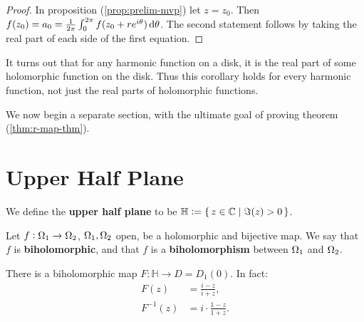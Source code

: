 \begin{proof}
In proposition (\ref{prop:prelim-mvp}) let $z=z_0$. Then $f(z_0) = a_0 = \frac{1}{2 \pi} \int_0^{2 \pi} f( z_0 + r e^{i \theta} ) \dif \theta$. The second statement follows by taking the real part of each side of the first equation.
\end{proof}

\begin{remark}
It turns out that for any harmonic function on a disk, it is the real part of some holomorphic function on the disk. Thus this corollary holds for every harmonic function, not just the real parts of holomorphic functions.
\end{remark}

We now begin a separate section, with the ultimate goal of proving theorem (\ref{thm:r-map-thm}).

\section{Upper Half Plane}

\begin{definition}
We define the \textbf{upper half plane} to be $\mathbb{H} \vcentcolon = \set{z \in \mathbb{C}\mid \Im (z) > 0}$.

\end{definition}


\begin{definition}
Let $f: \Omega_1 \to \Omega_2$, $\Omega_1, \Omega_2$ open, be a holomorphic and bijective map. We say that $f$ is \textbf{biholomorphic}, and that $f$ is a \textbf{biholomorphism} between $\Omega_1$ and $\Omega_2$.
\end{definition}

\begin{proposition}
There is a biholomorphic map $F: \mathbb{H} \to D = D_1 (0)$. In fact:
\begin{align*}
    F(z) &= \frac{i-z}{i+z},\\
    F^{-1}(z) &= i \cdot \frac{1-z}{1+z}.
\end{align*}
\end{proposition}

\begin{center}
\end{center}



